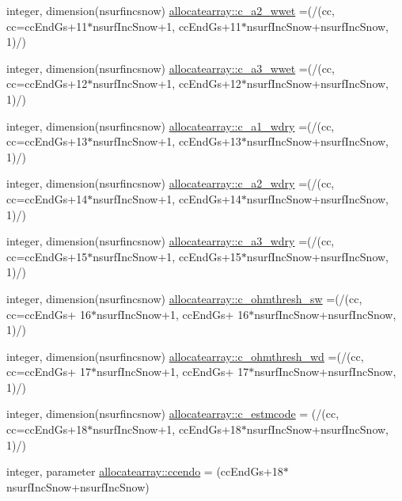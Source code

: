 \begin{DoxyCompactItemize}
\item 
integer, dimension(nsurfincsnow) \hyperlink{namespaceallocatearray_af34e6c63b5df6dcc656b4434f8e6790f}{allocatearray\+::c\+\_\+a2\+\_\+wwet} =(/(cc, cc=cc\+End\+Gs+11$\ast$nsurf\+Inc\+Snow+1, cc\+End\+Gs+11$\ast$nsurf\+Inc\+Snow+nsurf\+Inc\+Snow, 1)/)
\item 
integer, dimension(nsurfincsnow) \hyperlink{namespaceallocatearray_a53b87e670c605abe2161e0fdc25f87fd}{allocatearray\+::c\+\_\+a3\+\_\+wwet} =(/(cc, cc=cc\+End\+Gs+12$\ast$nsurf\+Inc\+Snow+1, cc\+End\+Gs+12$\ast$nsurf\+Inc\+Snow+nsurf\+Inc\+Snow, 1)/)
\item 
integer, dimension(nsurfincsnow) \hyperlink{namespaceallocatearray_ae30c247162a61d3f6feb20ef75f9c046}{allocatearray\+::c\+\_\+a1\+\_\+wdry} =(/(cc, cc=cc\+End\+Gs+13$\ast$nsurf\+Inc\+Snow+1, cc\+End\+Gs+13$\ast$nsurf\+Inc\+Snow+nsurf\+Inc\+Snow, 1)/)
\item 
integer, dimension(nsurfincsnow) \hyperlink{namespaceallocatearray_ae537fc0a303aa7ab49bd478a2cdd9798}{allocatearray\+::c\+\_\+a2\+\_\+wdry} =(/(cc, cc=cc\+End\+Gs+14$\ast$nsurf\+Inc\+Snow+1, cc\+End\+Gs+14$\ast$nsurf\+Inc\+Snow+nsurf\+Inc\+Snow, 1)/)
\item 
integer, dimension(nsurfincsnow) \hyperlink{namespaceallocatearray_a8bcd3cee05059ebc666f6d534190375c}{allocatearray\+::c\+\_\+a3\+\_\+wdry} =(/(cc, cc=cc\+End\+Gs+15$\ast$nsurf\+Inc\+Snow+1, cc\+End\+Gs+15$\ast$nsurf\+Inc\+Snow+nsurf\+Inc\+Snow, 1)/)
\item 
integer, dimension(nsurfincsnow) \hyperlink{namespaceallocatearray_a1797c2a2276d91be8028454587aeac96}{allocatearray\+::c\+\_\+ohmthresh\+\_\+sw} =(/(cc, cc=cc\+End\+Gs+ 16$\ast$nsurf\+Inc\+Snow+1, cc\+End\+Gs+ 16$\ast$nsurf\+Inc\+Snow+nsurf\+Inc\+Snow, 1)/)
\item 
integer, dimension(nsurfincsnow) \hyperlink{namespaceallocatearray_a535607f7b8841709da7652a90a12067a}{allocatearray\+::c\+\_\+ohmthresh\+\_\+wd} =(/(cc, cc=cc\+End\+Gs+ 17$\ast$nsurf\+Inc\+Snow+1, cc\+End\+Gs+ 17$\ast$nsurf\+Inc\+Snow+nsurf\+Inc\+Snow, 1)/)
\item 
integer, dimension(nsurfincsnow) \hyperlink{namespaceallocatearray_abae147fda5b19fe8fc0944b217968bf8}{allocatearray\+::c\+\_\+estmcode} = (/(cc, cc=cc\+End\+Gs+18$\ast$nsurf\+Inc\+Snow+1, cc\+End\+Gs+18$\ast$nsurf\+Inc\+Snow+nsurf\+Inc\+Snow, 1)/)
\item 
integer, parameter \hyperlink{namespaceallocatearray_a5faced76ae500e1295bf6364fd110bd1}{allocatearray\+::ccendo} = (cc\+End\+Gs+18$\ast$nsurf\+Inc\+Snow+nsurf\+Inc\+Snow)

\end{DoxyCompactItemize}

